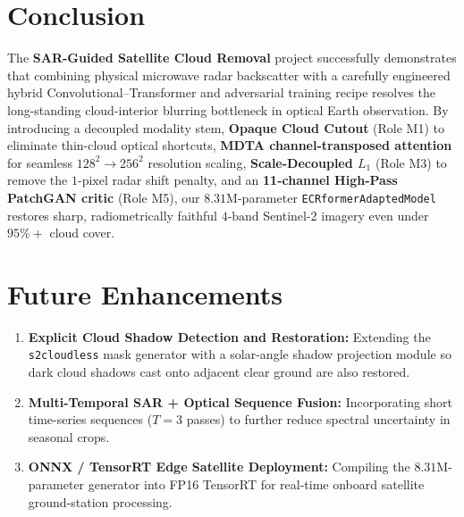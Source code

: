 \documentclass[12pt,a4paper]{report}
\begin{document}
\section{Conclusion}
The \textbf{SAR-Guided Satellite Cloud Removal} project successfully demonstrates that combining physical microwave radar backscatter with a carefully engineered hybrid Convolutional--Transformer and adversarial training recipe resolves the long-standing cloud-interior blurring bottleneck in optical Earth observation. By introducing a decoupled modality stem, \textbf{Opaque Cloud Cutout} (Role M1) to eliminate thin-cloud optical shortcuts, \textbf{MDTA channel-transposed attention} for seamless $128^2 \to 256^2$ resolution scaling, \textbf{Scale-Decoupled $L_1$} (Role M3) to remove the $1\text{-pixel}$ radar shift penalty, and an \textbf{11-channel High-Pass PatchGAN critic} (Role M5), our $8.31\text{M}$-parameter \texttt{ECRformerAdaptedModel} restores sharp, radiometrically faithful $4\text{-band}$ Sentinel-2 imagery even under $95\%+$ cloud cover.

\section{Future Enhancements}
\begin{enumerate}
    \item \textbf{Explicit Cloud Shadow Detection and Restoration:} Extending the \texttt{s2cloudless} mask generator with a solar-angle shadow projection module so dark cloud shadows cast onto adjacent clear ground are also restored.
    \item \textbf{Multi-Temporal SAR + Optical Sequence Fusion:} Incorporating short time-series sequences ($T=3$ passes) to further reduce spectral uncertainty in seasonal crops.
    \item \textbf{ONNX / TensorRT Edge Satellite Deployment:} Compiling the $8.31\text{M}$-parameter generator into FP16 TensorRT for real-time onboard satellite ground-station processing.
\end{enumerate}
\end{document}
